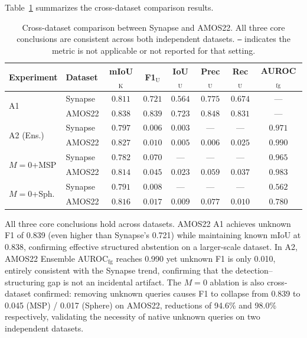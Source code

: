 \documentclass[journal]{IEEEtai}
\begin{document}
Table~\ref{tab:cross} summarizes the cross-dataset comparison results.
\begin{table}[!t]
\centering
\caption{Cross-dataset comparison between Synapse and AMOS22.
All three core conclusions are consistent across both independent datasets.
\texttt{---} indicates the metric is not applicable or not reported for that setting.}\label{tab:cross}
\scriptsize
\setlength{\tabcolsep}{3pt}
\begin{tabular}{ll ccc cc c}
\toprule
Experiment & Dataset & mIoU$_{\text{K}}$ & F1$_{\text{U}}$ & IoU$_{\text{U}}$ & Prec$_{\text{U}}$ & Rec$_{\text{U}}$ & AUROC$_{\text{fg}}$ \\
\midrule
\multirow{2}{*}{A1} & Synapse & $0.811$ & $0.721$ & $0.564$ & $0.775$ & $0.674$ & --- \\
                     & AMOS22  & $0.838$ & $0.839$ & $0.723$ & $0.848$ & $0.831$ & --- \\
\midrule
\multirow{2}{*}{A2 (Ens.)} & Synapse & $0.797$ & $0.006$ & $0.003$ & --- & --- & $0.971$ \\
                            & AMOS22  & $0.827$ & $0.010$ & $0.005$ & $0.006$ & $0.025$ & $0.990$ \\
\midrule
\multirow{2}{*}{$M\!=\!0$+MSP} & Synapse & $0.782$ & $0.070$ & --- & --- & --- & $0.965$ \\
                                 & AMOS22  & $0.814$ & $0.045$ & $0.023$ & $0.059$ & $0.037$ & $0.983$ \\
\multirow{2}{*}{$M\!=\!0$+Sph.} & Synapse & $0.791$ & $0.008$ & --- & --- & --- & $0.562$ \\
                                  & AMOS22  & $0.816$ & $0.017$ & $0.009$ & $0.077$ & $0.010$ & $0.780$ \\
\bottomrule
\end{tabular}
\end{table}

All three core conclusions hold across datasets.
AMOS22 A1 achieves unknown F1 of 0.839 (even higher than Synapse's 0.721) while
maintaining known mIoU at 0.838, confirming effective structured abstention on a
larger-scale dataset.
In A2, AMOS22 Ensemble AUROC$_{\text{fg}}$ reaches 0.990 yet unknown F1 is only 0.010,
entirely consistent with the Synapse trend, confirming that the detection--structuring
gap is not an incidental artifact.
The $M=0$ ablation is also cross-dataset confirmed: removing unknown queries causes F1
to collapse from 0.839 to 0.045 (MSP) / 0.017 (Sphere) on AMOS22, reductions of 94.6\%
and 98.0\% respectively, validating the necessity of native unknown queries on two
independent datasets.
\end{document}
